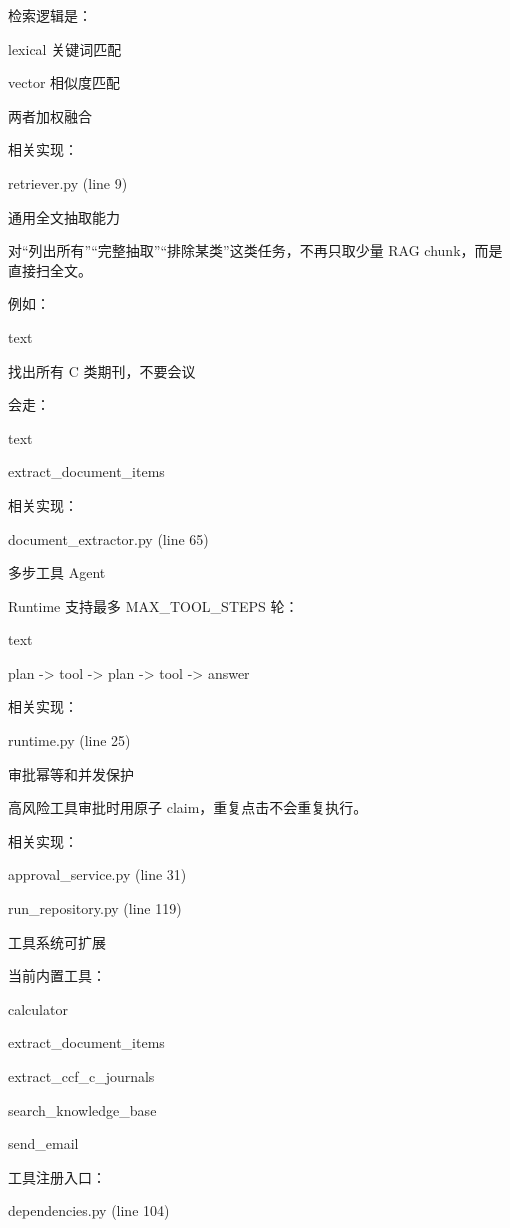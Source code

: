 检索逻辑是：


lexical 关键词匹配

vector 相似度匹配

两者加权融合


相关实现：


retriever.py (line 9)




通用全文抽取能力

对“列出所有”“完整抽取”“排除某类”这类任务，不再只取少量 RAG chunk，而是直接扫全文。

例如：

text



找出所有 C 类期刊，不要会议



会走：

text



extract_document_items



相关实现：


document_extractor.py (line 65)




多步工具 Agent

Runtime 支持最多 MAX_TOOL_STEPS 轮：

text



plan -> tool -> plan -> tool -> answer



相关实现：


runtime.py (line 25)




审批幂等和并发保护

高风险工具审批时用原子 claim，重复点击不会重复执行。

相关实现：


approval_service.py (line 31)

run_repository.py (line 119)




工具系统可扩展

当前内置工具：


calculator

extract_document_items

extract_ccf_c_journals

search_knowledge_base

send_email


工具注册入口：


dependencies.py (line 104)




